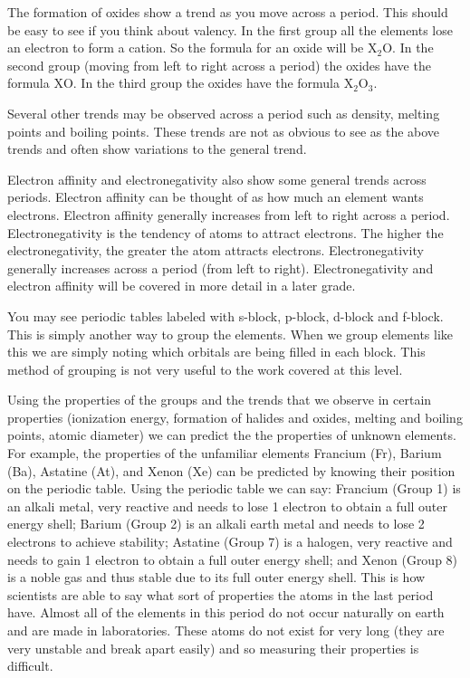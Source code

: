 \label{m38760*id7231}The formation of oxides show a trend as you move across a period. This should be easy to see if you think about valency. In the first group all the elements lose an electron to form a cation. So the formula for an oxide will be  ${\mathrm{X}}_{2}\mathrm{O}$. In the second group (moving from left to right across a period) the oxides have the formula $\mathrm{X}\mathrm{O}$. In the third group the oxides have the formula ${\mathrm{X}}_{2}{\mathrm{O}}_{3}$. \par 
\label{m38760*id7342}
Several other trends may be observed across a period such as density, melting points and boiling points. These trends are not as obvious to see as the above trends and often show variations to the general trend.\par 
\label{m38760*eip-217}Electron affinity and electronegativity also show some general trends across periods. Electron affinity can be thought of as how much an element wants electrons. Electron affinity generally increases from left to right across a period. Electronegativity is the tendency of atoms to attract electrons. The higher the electronegativity, the greater the atom attracts electrons. Electronegativity generally increases across a period (from left to right). Electronegativity and electron affinity will be covered in more detail in a later grade.\par \label{m38760*eip-293}You may see periodic tables labeled with s-block, p-block, d-block and f-block. This is simply another way to group the elements. When we group elements like this we are simply noting which orbitals are being filled in each block. This method of grouping is not very useful to the work covered at this level.\par 
\label{m38760*eip-151}Using the properties of the groups and the trends that we observe in certain properties (ionization energy, formation of halides and oxides, melting and boiling points, atomic diameter) we can predict the the properties of unknown elements. For example, the properties of the unfamiliar elements Francium (Fr), Barium (Ba), Astatine (At), and Xenon (Xe) can be predicted by knowing their position on the periodic table. Using the periodic table we can say: Francium (Group 1) is an alkali metal, very reactive and needs to lose 1 electron to obtain a full outer energy shell; Barium (Group 2) is an alkali earth metal and needs to lose 2 electrons to achieve stability; Astatine (Group 7) is a halogen, very reactive and needs to gain 1 electron to obtain a full outer energy shell; and Xenon (Group 8) is a noble gas and thus stable due to its full outer energy shell.   This is how scientists are able to say what sort of properties the atoms in the last period have. Almost all of the elements in this period do not occur naturally on earth and are made in laboratories. These atoms do not exist for very long (they are very unstable and break apart easily) and so measuring their properties is difficult.\par \label{m38760*secfhsst!!!underscore!!!id1062}
            


